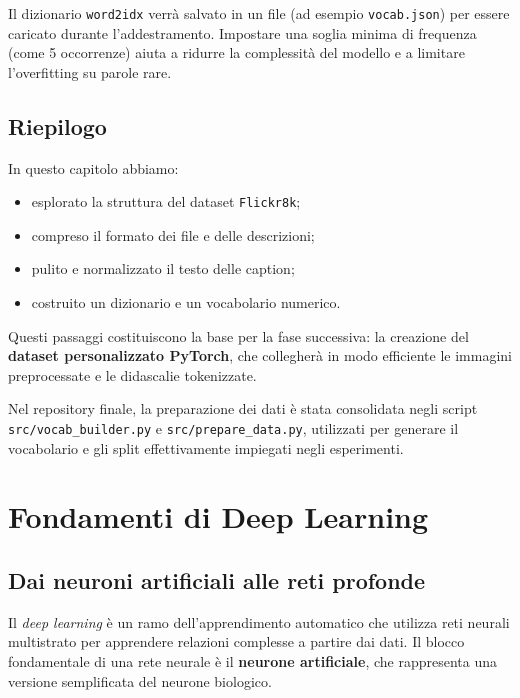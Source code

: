 \documentclass[11pt,a4paper]{report}
\newcommand{\dataset}{\texttt{Flickr8k}}
\begin{document}
\begin{tcolorbox}[title=Nota]
Il dizionario \texttt{word2idx} verrà salvato in un file (ad esempio \texttt{vocab.json}) per essere caricato durante l’addestramento.  
Impostare una soglia minima di frequenza (come 5 occorrenze) aiuta a ridurre la complessità del modello e a limitare l’overfitting su parole rare.
\end{tcolorbox}

\section{Riepilogo}

In questo capitolo abbiamo:
\begin{itemize}
  \item esplorato la struttura del dataset \dataset{};
  \item compreso il formato dei file e delle descrizioni;
  \item pulito e normalizzato il testo delle caption;
  \item costruito un dizionario e un vocabolario numerico.
\end{itemize}

Questi passaggi costituiscono la base per la fase successiva: la creazione del \textbf{dataset personalizzato PyTorch}, che collegherà in modo efficiente le immagini preprocessate e le didascalie tokenizzate.

\begin{tcolorbox}[title=Riferimento al codice]
Nel repository finale, la preparazione dei dati è stata consolidata negli script \texttt{src/vocab\_builder.py} e \texttt{src/prepare\_data.py}, utilizzati per generare il vocabolario e gli split effettivamente impiegati negli esperimenti.
\end{tcolorbox}


\chapter{Fondamenti di Deep Learning}

\section{Dai neuroni artificiali alle reti profonde}

Il \emph{deep learning} è un ramo dell’apprendimento automatico che utilizza reti neurali multistrato per apprendere relazioni complesse a partire dai dati.  
Il blocco fondamentale di una rete neurale è il \textbf{neurone artificiale}, che rappresenta una versione semplificata del neurone biologico.
\end{document}
